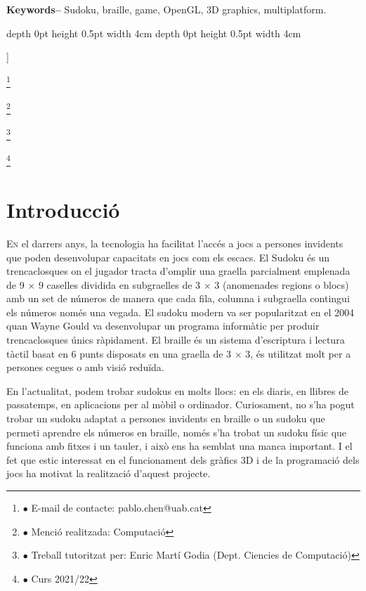 ﻿\documentclass[10pt,a4paper,twocolumn,twoside]{article}
\newcommand\blfootnote[1]{%
    \begingroup
    \renewcommand\thefootnote{}\footnote{#1}%
    \addtocounter{footnote}{-1}%
    \endgroup
}
\begin{document}
\begin{@twocolumnfalse}
\begin{center}
{                \textbf{Keywords-- } Sudoku, braille, game, OpenGL, 3D graphics, multiplatform. \\}

            \bigskip

            {\vrule depth 0pt height 0.5pt width 4cm\hspace{7.5pt}%
                \hspace{7.5pt}\vrule depth 0pt height 0.5pt width 4cm\relax}

        \end{center}

        \bigskip
    \end{@twocolumnfalse}]

\blfootnote{$\bullet$ E-mail de contacte: pablo.chen@uab.cat}
\blfootnote{$\bullet$ Menció realitzada: Computació}
\blfootnote{$\bullet$ Treball tutoritzat per: Enric Martí Godia (Dept. Ciencies de Computació)}
\blfootnote{$\bullet$ Curs 2021/22}

\section{Introducció}\label{sec:introduction}

\lettrine[lines=3]
En el darrers anys, la tecnologia ha facilitat l'accés a jocs a persones invidents que poden
desenvolupar capacitats en jocs com els escacs. El Sudoku és un trencaclosques on el jugador
tracta d'omplir una graella parcialment emplenada de 9 $\times$ 9 caselles dividida en subgraelles
de 3 $\times$ 3 (anomenades regions o blocs) amb un set de números de manera que cada fila, columna i
subgraella contingui els números només una vegada. El sudoku modern va ser popularitzat en el 2004
quan Wayne Gould va desenvolupar un programa informàtic per produir trencaclosques únics
ràpidament. El braille és un sistema d'escriptura i lectura tàctil basat en 6 punts
disposats en una graella de 3 $\times$ 3, és utilitzat molt per a persones cegues o amb visió
reduïda.


En l'actualitat, podem trobar sudokus en molts llocs: en els diaris, en llibres de passatemps, en
aplicacions per al mòbil o ordinador. Curiosament, no s'ha pogut trobar un sudoku adaptat a
persones invidents en braille o un sudoku que permeti aprendre els números en braille, només s'ha
trobat un sudoku físic que funciona amb fitxes i un tauler\cite{sudoku}, i això ens ha semblat una
manca important. I el fet que estic interessat en el funcionament dels gràfics 3D i de la
programació dels jocs ha motivat la realització d'aquest projecte.
\end{document}
